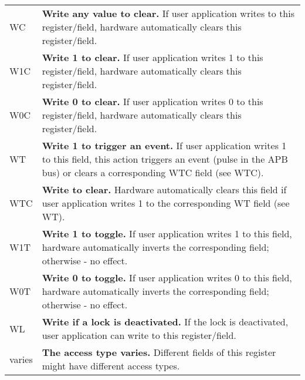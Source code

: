 \begin{longtable}[c]{ R{1cm} p{13cm} }
WC & \textbf{Write any value to clear.} 
	If user application writes to this register/field, hardware automatically clears this register/field. \\
W1C & \textbf{Write 1 to clear.} 
	If user application writes 1 to this register/field, hardware automatically clears this register/field. \\
W0C & \textbf{Write 0 to clear.} 
	If user application writes 0 to this register/field, hardware automatically clears this register/field. \\

WT & \textbf{Write 1 to trigger an event.} 
	If user application writes 1 to this field, this action triggers an event (pulse in the APB bus) or clears a corresponding WTC field (see WTC). \\
WTC & \textbf{Write to clear.} 
	Hardware automatically clears this field if user application writes 1 to the corresponding WT field (see WT). \\

W1T & \textbf{Write 1 to toggle.} 
	If user application writes 1 to this field, hardware automatically inverts the corresponding field; otherwise - no effect. \\
W0T & \textbf{Write 0 to toggle.} 
	If user application writes 0 to this field, hardware automatically inverts the corresponding field; otherwise - no effect. \\

WL & \textbf{Write if a lock is deactivated.} 
	If the lock is deactivated, user application can write to this register/field. \\

varies & \textbf{The access type varies.} 
	 Different fields of this register might have different access types. \\

\end{longtable}
